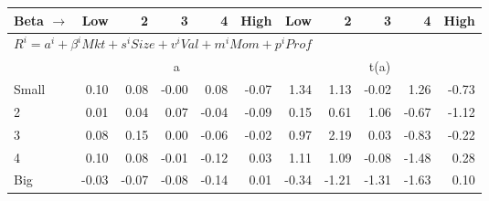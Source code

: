 
\begin{tabular}{lrrrrrrrrrr}
  \toprule
    
    Beta $\rightarrow$ & Low & 2 & 3 & 4 & High & Low & 2 & 3 & 4 & High  \\ 
  \midrule
  \multicolumn{11}{l}{$R^i=a^i+\beta^iMkt+s^iSize+v^iVal+m^iMom+p^iProf$}  \\
  
     & \multicolumn{5}{c}{a} & \multicolumn{5}{c}{t(a)}   \\
     \cmidrule(r){2-6} \cmidrule(r){7-11} 
    Small  & 0.10  & 0.08  & -0.00  & 0.08  & -0.07  & 1.34  & 1.13  & -0.02  & 1.26  & -0.73   \\
    2  & 0.01  & 0.04  & 0.07  & -0.04  & -0.09  & 0.15  & 0.61  & 1.06  & -0.67  & -1.12   \\
    3  & 0.08  & 0.15  & 0.00  & -0.06  & -0.02  & 0.97  & 2.19  & 0.03  & -0.83  & -0.22   \\
    4  & 0.10  & 0.08  & -0.01  & -0.12  & 0.03  & 1.11  & 1.09  & -0.08  & -1.48  & 0.28   \\
    Big  & -0.03  & -0.07  & -0.08  & -0.14  & 0.01  & -0.34  & -1.21  & -1.31  & -1.63  & 0.10   \\
    
  
    
  
    

\end{tabular}
